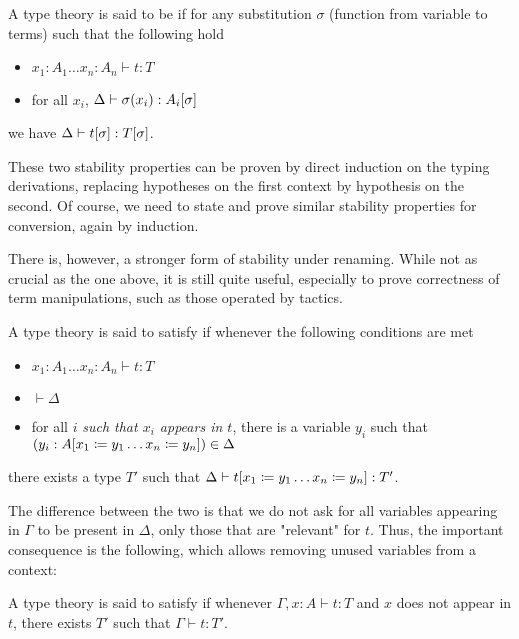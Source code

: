\begin{property}
  \label{prop:stab-subst}
  A type theory is said to be 
  if for any substitution $\sigma$ (function from variable to terms)
  such that the following hold
  \begin{itemize}
    \item $x_1 : A_1 \dots x_n : A_n \vdash t : T$
    \item for all $x_i$, $\Delta \vdash \sigma(x_i) : A_i[\sigma]$
  \end{itemize} 
  we have $\Delta \vdash t[\sigma] : T[\sigma]$.
\end{property}

These two stability properties can be proven by direct induction on the typing derivations,
replacing hypotheses on the first context by hypothesis on the second. Of course, we need to
state and prove similar stability properties for conversion, again by induction.

There is, however, a stronger form of stability under renaming. While not as crucial as the
one above, it is still quite useful, especially to prove correctness of term manipulations,
such as those operated by tactics.

\begin{property}
  \label{prop:strong-stab-renaming}
  A type theory is said to satisfy 
  if whenever the following conditions are met
  \begin{itemize}
    \item $x_1 : A_1 \dots x_n : A_n \vdash t : T$
    \item $\vdash \Delta$
    \item for all $i$ \emph{such that $x_i$ appears in $t$}, there is a variable $y_i$ such that $(y_i : A[x_1 \coloneqq y_1 \dots x_n \coloneqq y_n]) \in \Delta$
  \end{itemize} 
  there exists a type $T'$ such that $\Delta \vdash t[x_1 \coloneqq y_1 \dots x_n \coloneqq y_n] : T'$.
\end{property}

The difference between the two is that we do not ask for all variables appearing in $\Gamma$
to be present in $\Delta$, only those that are "relevant" for $t$.
Thus, the important consequence is the following, which allows removing unused variables
from a context:

\begin{property}[Strengthening]
  \label{prop:strengthening}
  A type theory is said to satisfy  if whenever
  $\Gamma, x : A \vdash t : T$ and $x$ does not appear in $t$,
  there exists $T'$ such that $\Gamma \vdash t : T'$.
\end{property}

